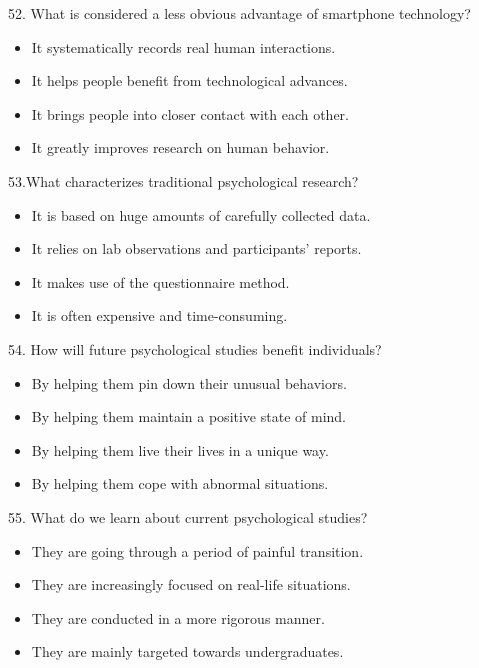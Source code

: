 \documentclass[UTF8,11pt]{ctexart}
\begin{document}
52. What is considered a less obvious advantage of smartphone technology?


\begin{itemize}[leftmargin=2em,itemsep=.2em,topsep=.4em]\item[A.] It systematically records real human interactions.
\item[B.] It helps people benefit from technological advances.
\item[C.] It brings people into closer contact with each other.
\item[D.] It greatly improves research on human behavior.
\end{itemize}

53.What characterizes traditional psychological research?


\begin{itemize}[leftmargin=2em,itemsep=.2em,topsep=.4em]\item[A.] It is based on huge amounts of carefully collected data.
\item[B.] It relies on lab observations and participants’ reports.
\item[C.] It makes use of the questionnaire method.
\item[D.] It is often expensive and time-consuming.
\end{itemize}

54. How will future psychological studies benefit individuals?


\begin{itemize}[leftmargin=2em,itemsep=.2em,topsep=.4em]\item[A.] By helping them pin down their unusual behaviors.
\end{itemize}

\begin{itemize}[leftmargin=2em,itemsep=.2em,topsep=.4em]\item[B.] By helping them maintain a positive state of mind.
\item[C.] By helping them live their lives in a unique way.
\item[D.] By helping them cope with abnormal situations.
\end{itemize}

55. What do we learn about current psychological studies?


\begin{itemize}[leftmargin=2em,itemsep=.2em,topsep=.4em]\item[A.] They are going through a period of painful transition.
\item[B.] They are increasingly focused on real-life situations.
\item[C.] They are conducted in a more rigorous manner.
\item[D.] They are mainly targeted towards undergraduates.
\end{itemize}
\end{document}
